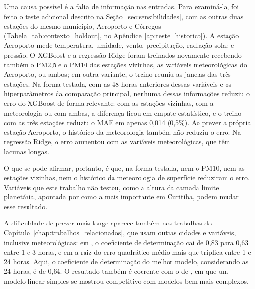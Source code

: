 Uma causa possível é a falta de informação nas entradas. Para examiná-la, foi feito o teste adicional descrito na Seção~\ref{sec:sensibilidades}, com as outras duas estações do mesmo município, Aeroporto e Córregos (Tabela~\ref{tab:contexto_holdout}, no Apêndice~\ref{ap:teste_historico}). A estação Aeroporto mede temperatura, umidade, vento, precipitação, radiação solar e pressão. O XGBoost e a regressão Ridge foram treinados novamente recebendo também o PM2,5 e o PM10 das estações vizinhas, as variáveis meteorológicas do Aeroporto, ou ambos; em outra variante, o treino reuniu as janelas das três estações. Na forma testada, com as 48 horas anteriores dessas variáveis e os hiperparâmetros da comparação principal, nenhuma dessas informações reduziu o erro do XGBoost de forma relevante: com as estações vizinhas, com a meteorologia ou com ambas, a diferença ficou em empate estatístico, e o treino com as três estações reduziu o MAE em apenas 0,014 (0,5\%). Ao prever a própria estação Aeroporto, o histórico da meteorologia também não reduziu o erro. Na regressão Ridge, o erro aumentou com as variáveis meteorológicas, que têm lacunas longas.

O que se pode afirmar, portanto, é que, na forma testada, nem o PM10, nem as estações vizinhas, nem o histórico da meteorologia de superfície reduziram o erro. Variáveis que este trabalho não testou, como a altura da camada limite planetária, apontada por  como a mais importante em Curitiba, podem mudar esse resultado.

A dificuldade de prever mais longe aparece também nos trabalhos do Capítulo~\ref{chap:trabalhos_relacionados}, que usam outras cidades e variáveis, inclusive meteorológicas: em , o coeficiente de determinação cai de 0,83 para 0,63 entre 1 e 3 horas, e em  a raiz do erro quadrático médio mais que triplica entre 1 e 24 horas. Aqui, o coeficiente de determinação do melhor modelo, considerando as 24 horas, é de 0,64. O resultado também é coerente com o de , em que um modelo linear simples se mostrou competitivo com modelos bem mais complexos.
